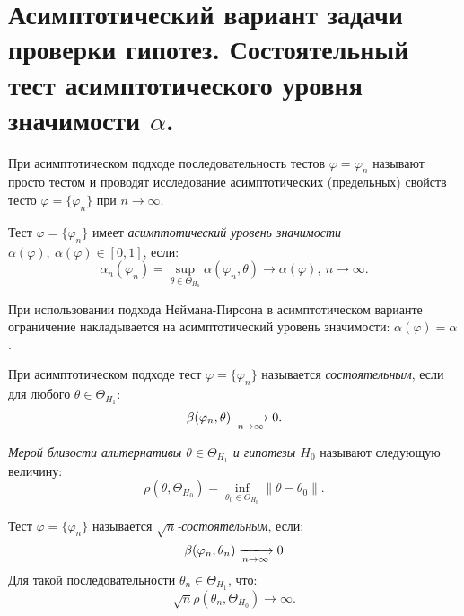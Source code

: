 \section{Асимптотический вариант задачи проверки гипотез. Состоятельный тест
асимптотического уровня значимости $\alpha$.}

При асимптотическом подходе последовательность тестов $\varphi = \varphi_n$
называют просто тестом и проводят исследование асимптотических (предельных)
свойств тесто $\varphi = \{\varphi_n\}$ при $n \to \infty$.\\

\begin{definition}
  Тест $\varphi = \{\varphi_n\}$ имеет \textit{асимптотический уровень
  значимости $\alpha(\varphi),~ \alpha(\varphi) \in \left[0, 1 \right]$}, если:
  \[
    \alpha_n(\varphi_n) =
    \sup_{\theta \in \Theta_{H_0}} \alpha(\varphi_n, \theta) \to
    \alpha(\varphi),~ n \to \infty
  .\]
\end{definition}

При использовании подхода Неймана-Пирсона в асимптотическом варианте ограничение
накладывается на асимптотический уровень значимости: $\alpha(\varphi) = \alpha$.

\begin{definition}
  При асимптотическом подходе тест $\varphi = \{\varphi_n\}$ называется
  \textit{состоятельным}, если для любого $\theta \in \Theta_{H_1}$:
  \[
    \beta(\varphi_n, \theta) \xlongrightarrow[n \to \infty]{} 0
  .\]
\end{definition}


\begin{definition}
  \textit{Мерой близости альтернативы $\theta \in \Theta_{H_1}$ и гипотезы
  $H_0$} называют следующую величину:
  \[
    \rho(\theta, \Theta_{H_0}) = \inf_{\theta_0 \in \Theta_{H_0}}
    \left\lVert \theta - \theta_0 \right\rVert
  .\]
\end{definition}

\begin{definition}
  Тест $\varphi = \{\varphi_n\}$ называется \textit{$\sqrt{n}$-состоятельным},
  если:
  \[
    \beta(\varphi_n, \theta_n) \xlongrightarrow[n \to \infty]{} 0
  \]
  Для такой последовательности $\theta_n \in \Theta_{H_1}$, что:
  \[
    \sqrt{n} \rho(\theta_n, \Theta_{H_0}) \to \infty
  .\]
\end{definition}
